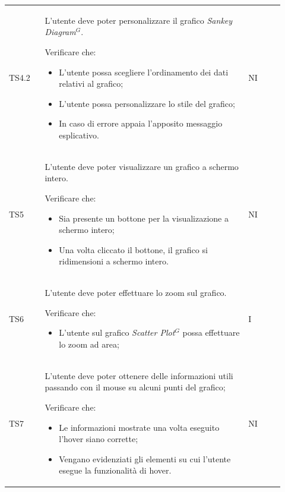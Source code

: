 \begin{longtable}{p{0.12\linewidth}p{0.68\linewidth}p{0.12\linewidth}}
    \rowcolor[RGB]{216, 235, 171}
    TS4.2 &
    L'utente deve poter personalizzare il grafico \textit{Sankey Diagram}$^{G}$. \par
    Verificare che:
    \begin{itemize}
        \item L'utente possa scegliere l'ordinamento dei dati relativi al grafico;
        \item L'utente possa personalizzare lo stile del grafico;
        \item In caso di errore appaia l'apposito messaggio esplicativo.
    \end{itemize}&
    NI \\

    \rowcolor[RGB]{233, 245, 206}
    TS5 &
    L'utente deve poter visualizzare un grafico a schermo intero. \par 
    Verificare che:
    \begin{itemize}
        \item Sia presente un bottone per la visualizazione a schermo intero;
        \item Una volta cliccato il bottone, il grafico si ridimensioni a schermo intero.
    \end{itemize}&
    NI \\

    \rowcolor[RGB]{216, 235, 171}
    TS6 &
    L'utente deve poter effettuare lo zoom sul grafico. \par 
    Verificare che:
    \begin{itemize}
        \item L'utente sul grafico \textit{Scatter Plot}$^{G}$ possa effettuare lo zoom ad area;
    \end{itemize}&
    I \\

    \rowcolor[RGB]{233, 245, 206}
    TS7 &
    L'utente deve poter ottenere delle informazioni utili passando con il mouse su alcuni punti del grafico;\par
    Verificare che:
    \begin{itemize}
        \item Le informazioni mostrate una volta eseguito l'hover siano corrette;
        \item Vengano evidenziati gli elementi su cui l'utente esegue la funzionalità di hover.
    \end{itemize}&
    NI \\


\end{longtable}

